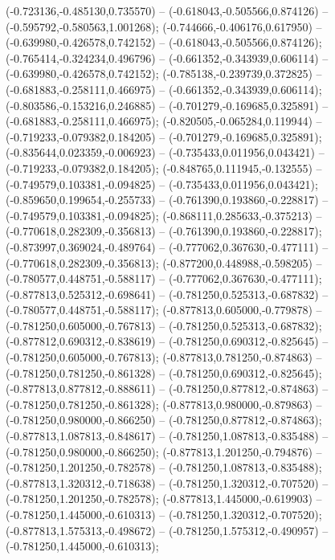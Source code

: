  (-0.723136,-0.485130,0.735570) -- (-0.618043,-0.505566,0.874126) -- (-0.595792,-0.580563,1.001268);
 (-0.744666,-0.406176,0.617950) -- (-0.639980,-0.426578,0.742152) -- (-0.618043,-0.505566,0.874126);
 (-0.765414,-0.324234,0.496796) -- (-0.661352,-0.343939,0.606114) -- (-0.639980,-0.426578,0.742152);
 (-0.785138,-0.239739,0.372825) -- (-0.681883,-0.258111,0.466975) -- (-0.661352,-0.343939,0.606114);
 (-0.803586,-0.153216,0.246885) -- (-0.701279,-0.169685,0.325891) -- (-0.681883,-0.258111,0.466975);
 (-0.820505,-0.065284,0.119944) -- (-0.719233,-0.079382,0.184205) -- (-0.701279,-0.169685,0.325891);
 (-0.835644,0.023359,-0.006923) -- (-0.735433,0.011956,0.043421) -- (-0.719233,-0.079382,0.184205);
 (-0.848765,0.111945,-0.132555) -- (-0.749579,0.103381,-0.094825) -- (-0.735433,0.011956,0.043421);
 (-0.859650,0.199654,-0.255733) -- (-0.761390,0.193860,-0.228817) -- (-0.749579,0.103381,-0.094825);
 (-0.868111,0.285633,-0.375213) -- (-0.770618,0.282309,-0.356813) -- (-0.761390,0.193860,-0.228817);
 (-0.873997,0.369024,-0.489764) -- (-0.777062,0.367630,-0.477111) -- (-0.770618,0.282309,-0.356813);
 (-0.877200,0.448988,-0.598205) -- (-0.780577,0.448751,-0.588117) -- (-0.777062,0.367630,-0.477111);
 (-0.877813,0.525312,-0.698641) -- (-0.781250,0.525313,-0.687832) -- (-0.780577,0.448751,-0.588117);
 (-0.877813,0.605000,-0.779878) -- (-0.781250,0.605000,-0.767813) -- (-0.781250,0.525313,-0.687832);
 (-0.877812,0.690312,-0.838619) -- (-0.781250,0.690312,-0.825645) -- (-0.781250,0.605000,-0.767813);
 (-0.877813,0.781250,-0.874863) -- (-0.781250,0.781250,-0.861328) -- (-0.781250,0.690312,-0.825645);
 (-0.877813,0.877812,-0.888611) -- (-0.781250,0.877812,-0.874863) -- (-0.781250,0.781250,-0.861328);
 (-0.877813,0.980000,-0.879863) -- (-0.781250,0.980000,-0.866250) -- (-0.781250,0.877812,-0.874863);
 (-0.877813,1.087813,-0.848617) -- (-0.781250,1.087813,-0.835488) -- (-0.781250,0.980000,-0.866250);
 (-0.877813,1.201250,-0.794876) -- (-0.781250,1.201250,-0.782578) -- (-0.781250,1.087813,-0.835488);
 (-0.877813,1.320312,-0.718638) -- (-0.781250,1.320312,-0.707520) -- (-0.781250,1.201250,-0.782578);
 (-0.877813,1.445000,-0.619903) -- (-0.781250,1.445000,-0.610313) -- (-0.781250,1.320312,-0.707520);
 (-0.877813,1.575313,-0.498672) -- (-0.781250,1.575312,-0.490957) -- (-0.781250,1.445000,-0.610313);
